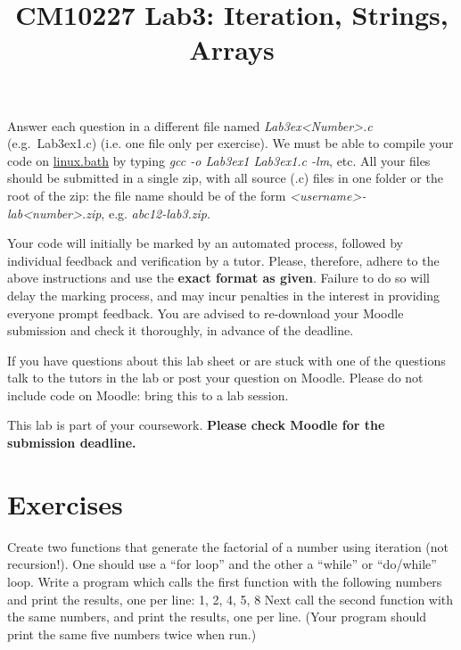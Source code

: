 \documentclass[12pt, a4paper, oneside]{article}
\author{}
\date{}
\title{CM10227 Lab3: Iteration, Strings, Arrays}
\newcounter{qstncntr}
\newcommand{\exerset}{ \vspace*{-11pt}\setcounter{qstncntr}{0} }
\newenvironment{exer}[1]{\vspace*{11pt}\noindent {{\bf Exercise} \stepcounter{qstncntr} \theqstncntr:} #1}{}
\begin{document}
\maketitle
Answer each question in a different file named \emph{Lab3ex<Number>.c }(e.g.\ Lab3ex1.c) (i.e. one file only per exercise).
We must be able to compile your code on \href{http://www.bath.ac.uk/guides/connecting-to-linux-bath/}{linux.bath} by typing \emph{gcc -o Lab3ex1 Lab3ex1.c -lm}, etc.
All your files should be submitted in a single zip, with all source (.c) files in one folder or the root of the zip:
the file name should be of the form \emph{<username>-lab<number>.zip}, e.g. \emph{abc12-lab3.zip}.

Your code will initially be marked by an automated process, followed by individual feedback and verification by a tutor.
Please, therefore, adhere to the above instructions and use the \textbf{exact format as given}.
Failure to do so will delay the marking process, and may incur penalties in the interest in providing everyone prompt feedback.
You are advised to re-download your Moodle submission and check it thoroughly, in advance of the deadline.

If you have questions about this lab sheet or are stuck with one of the questions talk to the tutors in the lab or post your question on Moodle.
Please do not include code on Moodle: bring this to a lab session.

This lab is part of your coursework.
\textbf{Please check Moodle for the submission deadline.}

\section*{Exercises}
\setlength{\parindent}{0cm} %
\exerset
\begin{exer}
  Create two functions that generate the factorial of a number using iteration (not recursion!). One should use a ``for loop'' and the other a ``while'' or ``do/while'' loop.
  Write a program which calls the first function with the following numbers and print the results, one per line:
  1, 2, 4, 5, 8
  Next call the second function with the same numbers, and print the results, one per line.
  (Your program should print the same five numbers twice when run.)
\end{exer}
\end{document}
